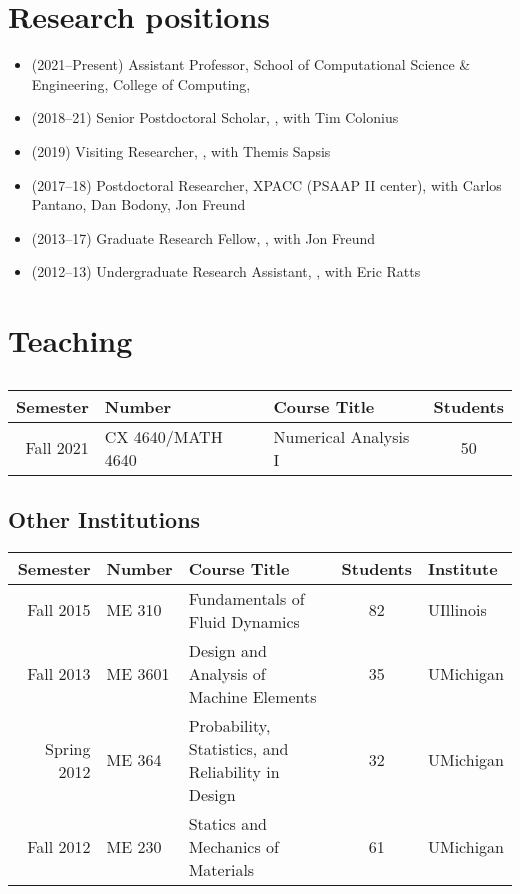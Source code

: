 \section{Research positions}

\begin{itemize}
    \item (2021--Present) Assistant Professor, School of Computational Science \& Engineering, College of Computing, \GIT
    \item (2018--21) Senior Postdoctoral Scholar, \CIT, with Tim Colonius
    \item (2019) Visiting Researcher, \MIT, with Themis Sapsis
    \item (2017--18) Postdoctoral Researcher, XPACC (PSAAP II center), with Carlos Pantano, Dan Bodony, Jon Freund
    \item (2013--17) Graduate Research Fellow, \UIUC, with Jon Freund
    \item (2012--13) Undergraduate Research Assistant, \UMD, with Eric Ratts
\end{itemize}

\section{Teaching}

\subsection{\GIT}

\begin{center}
    \begin{tabular}{ r l l c }
        \hline
        \bf Semester  &\bf Number & \bf Course Title & \bf Students \\
        \hline
        Fall 2021 & CX 4640/MATH 4640 & Numerical Analysis I & 50 \\
        \hline\hline
    \end{tabular}
\end{center}

\subsection{Other Institutions}

\begin{center}
    \begin{tabular}{ r l l c l }
        \hline\hline
        \bf Semester  &\bf Number & \bf Course Title & \bf Students & \bf Institute \\
        \hline
        Fall   2015 & ME 310  & Fundamentals of Fluid Dynamics & 82 & UIllinois \\
        Fall   2013 & ME 3601 & Design and Analysis of Machine Elements & 35 & UMichigan\\
        Spring 2012 & ME 364  & Probability, Statistics, and Reliability in Design & 32 & UMichigan \\
        Fall   2012 & ME 230  & Statics and Mechanics of Materials & 61 & UMichigan \\
        \hline\hline
    \end{tabular}
\end{center}



